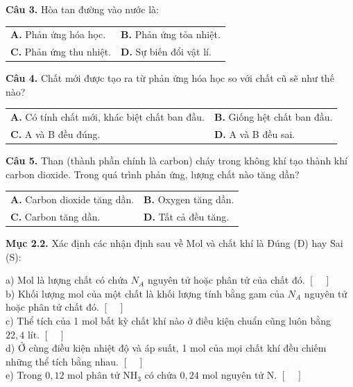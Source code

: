 \documentclass{article}
\begin{document}
\fontsize{26}{34}\selectfont
\textbf{Câu 3.} Hòa tan đường vào nước là:
\vspace{6pt}

\begin{tabularx}{\linewidth}{@{}X X@{}}
\textbf{A.} Phản ứng hóa học. & \textbf{B.} Phản ứng tỏa nhiệt.\\[8pt]
\textbf{C.} Phản ứng thu nhiệt. & \textbf{D.} Sự biến đổi vật lí.
\end{tabularx}

\vspace*{\fill}

\textbf{Câu 4.} Chất mới được tạo ra từ phản ứng hóa học so với chất cũ sẽ như thế nào?
\vspace{6pt}

\begin{tabularx}{\linewidth}{@{}X X@{}}
\textbf{A.} Có tính chất mới, khác biệt chất ban đầu. & \textbf{B.} Giống hệt chất ban đầu.\\[8pt]
\textbf{C.} A và B đều đúng. & \textbf{D.} A và B đều sai.
\end{tabularx}
\vspace*{\fill}
\newpage

\fontsize{26}{34}\selectfont
\textbf{Câu 5.} Than (thành phần chính là carbon) cháy trong không khí tạo thành khí carbon dioxide. Trong quá trình phản ứng, lượng chất nào tăng dần?
\vspace{16pt}

\begin{tabularx}{\linewidth}{@{}X X@{}}
\textbf{A.} Carbon dioxide tăng dần. & \textbf{B.} Oxygen tăng dần.\\[12pt]
\textbf{C.} Carbon tăng dần. & \textbf{D.} Tất cả đều tăng.
\end{tabularx}
\vspace*{\fill}
\newpage

\fontsize{24}{32}\selectfont
\textbf{Mục 2.2.} Xác định các nhận định sau về Mol và chất khí là Đúng (Đ) hay Sai (S):
\vspace{12pt}

a) Mol là lượng chất có chứa $N_A$ nguyên tử hoặc phân tử của chất đó. \hfill $[\quad]$\\[10pt]
b) Khối lượng mol của một chất là khối lượng tính bằng gam của $N_A$ nguyên tử hoặc phân tử chất đó. \hfill $[\quad]$\\[10pt]
c) Thể tích của 1 mol bất kỳ chất khí nào ở điều kiện chuẩn cũng luôn bằng $22,4\text{ lít}$. \hfill $[\quad]$\\[10pt]
d) Ở cùng điều kiện nhiệt độ và áp suất, 1 mol của mọi chất khí đều chiếm những thể tích bằng nhau. \hfill $[\quad]$\\[10pt]
e) Trong $0,12\text{ mol}$ phân tử $\text{NH}_3$ có chứa $0,24\text{ mol}$ nguyên tử N. \hfill $[\quad]$
\vspace*{\fill}
\newpage
\end{document}
